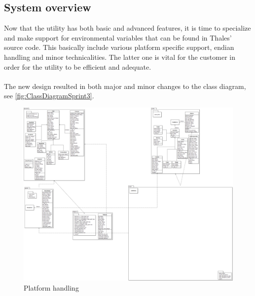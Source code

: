 \subsection{System overview}
Now that the \gls{utility} has both basic and advanced features, it is time to specialize and make support for environmental variables that can be found in Thales' source code. This basically include various platform specific support, \gls{endian} handling and minor technicalities. The latter one is vital for the customer in order for the \gls{utility} to be efficient and adequate. \\
\\
The new design resulted in both major and minor changes to the class diagram, see \autoref{fig:ClassDiagramSprint3}.
\begin{figure}[!htb]
	\includegraphics[width=\textwidth]{./sprints/img/ClassDiagramSprint3}
	\caption{Platform handling\label{fig:ClassDiagramSprint3}}
\end{figure}

